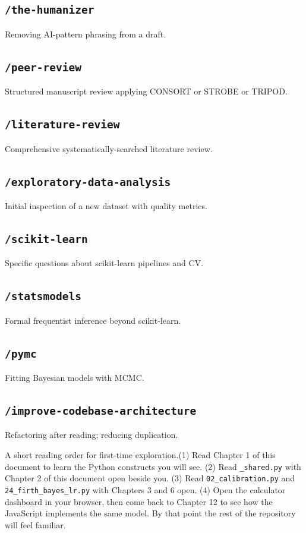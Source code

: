 \documentclass[11pt,a4paper]{article}
\begin{document}
\subsection*{\texttt{/the-humanizer}}
Removing AI-pattern phrasing from a draft.
\subsection*{\texttt{/peer-review}}
Structured manuscript review applying CONSORT or STROBE or TRIPOD.
\subsection*{\texttt{/literature-review}}
Comprehensive systematically-searched literature review.
\subsection*{\texttt{/exploratory-data-analysis}}
Initial inspection of a new dataset with quality metrics.
\subsection*{\texttt{/scikit-learn}}
Specific questions about scikit-learn pipelines and CV.
\subsection*{\texttt{/statsmodels}}
Formal frequentist inference beyond scikit-learn.
\subsection*{\texttt{/pymc}}
Fitting Bayesian models with MCMC.
\subsection*{\texttt{/improve-codebase-architecture}}
Refactoring after reading; reducing duplication.
\begin{callout}{A short reading order for first-time exploration.}(1) Read Chapter 1 of this document to learn the Python constructs you will see. (2) Read \texttt{\_shared.py} with Chapter 2 of this document open beside you. (3) Read \texttt{02\_calibration.py} and \texttt{24\_firth\_bayes\_lr.py} with Chapters 3 and 6 open. (4) Open the calculator dashboard in your browser, then come back to Chapter 12 to see how the JavaScript implements the same model. By that point the rest of the repository will feel familiar.\end{callout}
\end{document}
